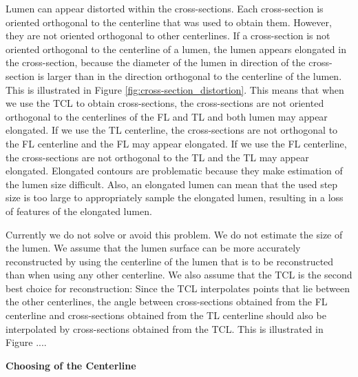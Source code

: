 \documentclass[thesis.tex]{subfiles}
\begin{document}
Lumen can appear distorted within the cross-sections. Each cross-section is oriented orthogonal to the centerline that was used to obtain them. However, they are not oriented orthogonal to other centerlines. If a cross-section is not oriented orthogonal to the centerline of a lumen, the lumen appears elongated in the cross-section, because the diameter of the lumen in direction of the cross-section is larger than in the direction orthogonal to the centerline of the lumen. This is illustrated in Figure \ref{fig:cross-section_distortion}. This means that when we use the TCL to obtain cross-sections, the cross-sections are not oriented orthogonal to the centerlines of the FL and TL and both lumen may appear elongated. If we use the TL centerline, the cross-sections are not orthogonal to the FL centerline and the FL may appear elongated. If we use the FL centerline, the cross-sections are not orthogonal to the TL and the TL may appear elongated. Elongated contours are problematic because they make estimation of the lumen size difficult. Also, an elongated lumen can mean that the used step size is too large to appropriately sample the elongated lumen, resulting in a loss of features of the elongated lumen.

Currently we do not solve or avoid this problem. We do not estimate the size of the lumen. We assume that the lumen surface can be more accurately reconstructed by using the centerline of the lumen that is to be reconstructed than when using any other centerline. We also assume that the TCL is the second best choice for reconstruction: Since the TCL interpolates points that lie between the other centerlines, the angle between cross-sections obtained from the FL centerline and cross-sections obtained from the TL centerline should also be interpolated by cross-sections obtained from the TCL. This is illustrated in Figure .... 

\textbf{Choosing of the Centerline}
\end{document}
